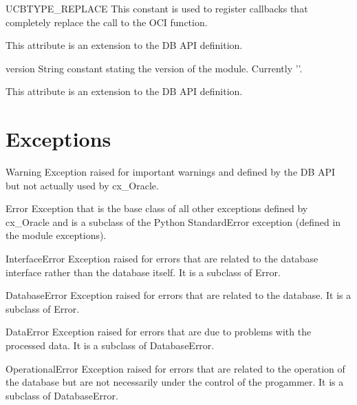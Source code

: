 \documentclass{manual}
\begin{document}
\begin{datadesc}{UCBTYPE_REPLACE}
  This constant is used to register callbacks that completely replace the
  call to the OCI function.

   This attribute is an extension to the DB API definition.
\end{datadesc}

\begin{datadesc}{version}
  String constant stating the version of the module. Currently '\version{}'.

   This attribute is an extension to the DB API definition.
\end{datadesc}

\section{Exceptions}

\begin{datadesc}{Warning}
  Exception raised for important warnings and defined by the DB API but not
  actually used by cx_Oracle.
\end{datadesc}

\begin{datadesc}{Error}
  Exception that is the base class of all other exceptions defined by
  cx_Oracle and is a subclass of the Python StandardError exception (defined in
  the module exceptions).
\end{datadesc}

\begin{datadesc}{InterfaceError}
  Exception raised for errors that are related to the database interface rather
  than the database itself. It is a subclass of Error.
\end{datadesc}

\begin{datadesc}{DatabaseError}
  Exception raised for errors that are related to the database. It is a
  subclass of Error.
\end{datadesc}

\begin{datadesc}{DataError}
  Exception raised for errors that are due to problems with the processed data.
  It is a subclass of DatabaseError.
\end{datadesc}

\begin{datadesc}{OperationalError}
  Exception raised for errors that are related to the operation of the database
  but are not necessarily under the control of the progammer. It is a
  subclass of DatabaseError.
\end{datadesc}
\end{document}
